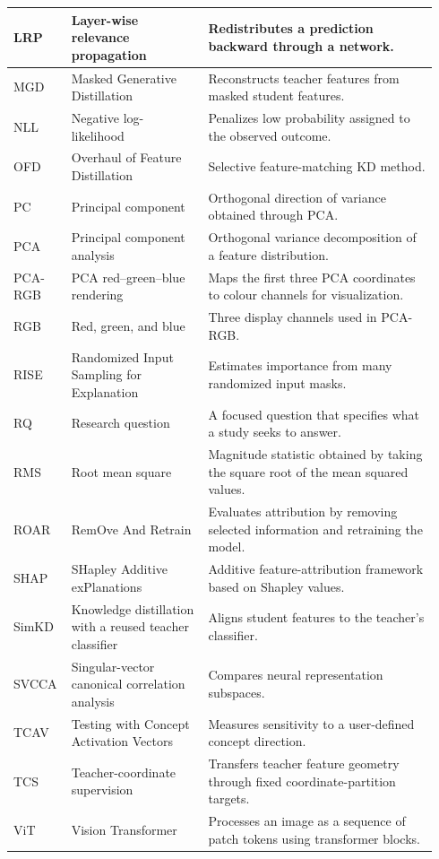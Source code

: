 \begin{longtable}{@{}L{0.11\linewidth}L{0.31\linewidth}L{0.52\linewidth}@{}}
LRP & Layer-wise relevance propagation & Redistributes a prediction backward through a network.\\ \midrule
MGD & Masked Generative Distillation & Reconstructs teacher features from masked student features.\\ \midrule
NLL & Negative log-likelihood & Penalizes low probability assigned to the observed outcome.\\ \midrule
OFD & Overhaul of Feature Distillation & Selective feature-matching KD method.\\ \midrule
PC & Principal component & Orthogonal direction of variance obtained through PCA.\\ \midrule
PCA & Principal component analysis & Orthogonal variance decomposition of a feature distribution.\\ \midrule
PCA-RGB & PCA red--green--blue rendering & Maps the first three PCA coordinates to colour channels for visualization.\\ \midrule
RGB & Red, green, and blue & Three display channels used in PCA-RGB.\\ \midrule
RISE & Randomized Input Sampling for Explanation & Estimates importance from many randomized input masks.\\ \midrule
RQ & Research question & A focused question that specifies what a study seeks to answer.\\ \midrule
RMS & Root mean square & Magnitude statistic obtained by taking the square root of the mean squared values.\\ \midrule
ROAR & RemOve And Retrain & Evaluates attribution by removing selected information and retraining the model.\\ \midrule
SHAP & SHapley Additive exPlanations & Additive feature-attribution framework based on Shapley values.\\ \midrule
SimKD & Knowledge distillation with a reused teacher classifier & Aligns student features to the teacher's classifier.\\ \midrule
SVCCA & Singular-vector canonical correlation analysis & Compares neural representation subspaces.\\ \midrule
TCAV & Testing with Concept Activation Vectors & Measures sensitivity to a user-defined concept direction.\\ \midrule
TCS & Teacher-coordinate supervision & Transfers teacher feature geometry through fixed coordinate-partition targets.\\ \midrule
ViT & Vision Transformer & Processes an image as a sequence of patch tokens using transformer blocks.\\
\bottomrule
\end{longtable}
\normalsize
